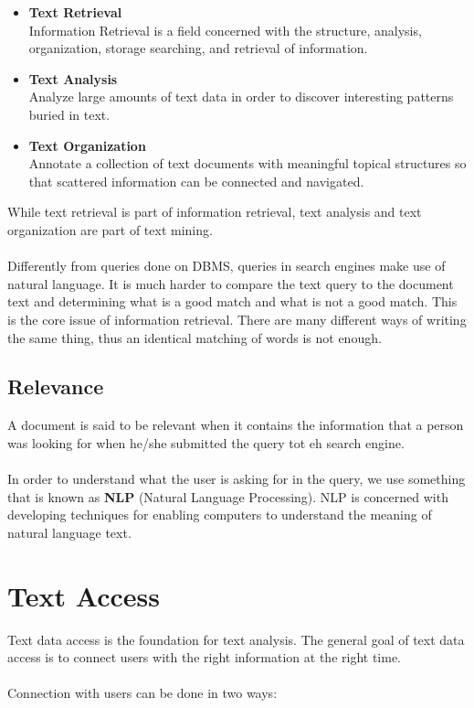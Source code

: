 \documentclass{article}
\begin{document}
\begin{itemize}
	\item \textbf{Text Retrieval}
	\vspace{.2cm} \\
	Information Retrieval is a field concerned with the structure, analysis, organization, storage searching, and retrieval of information.
	
	\item \textbf{Text Analysis}
	\vspace{.2cm} \\
	Analyze large amounts of text data in order to discover interesting patterns buried in text.
	
	\item \textbf{Text Organization}
	\vspace{.2cm} \\
	Annotate a collection of text documents with meaningful topical structures so that scattered information can be connected and navigated.
\end{itemize}
While text retrieval is part of information retrieval, text analysis and text organization are part of text mining. \\ \\
Differently from queries done on DBMS, queries in search engines make use of natural language. It is much harder to compare the text query to the document text and determining what is a good match and what is not a good match. This is the core issue of information retrieval. There are many different ways of writing the same thing, thus an identical matching of words is not enough.

\subsection{Relevance}
A document is said to be relevant when it contains the information that a person was looking for when he/she submitted the query tot eh search engine.\\ \\
In order to understand what the user is asking for in the query, we use something that is known as \textbf{NLP} (Natural Language Processing). NLP is concerned with developing techniques for enabling computers to understand the meaning of natural language text.

\section{Text Access}
Text data access is the foundation for text analysis. The general goal of text data access is to connect users with the right information at the right time. \\ \\
Connection with users can be done in two ways:
\end{document}
